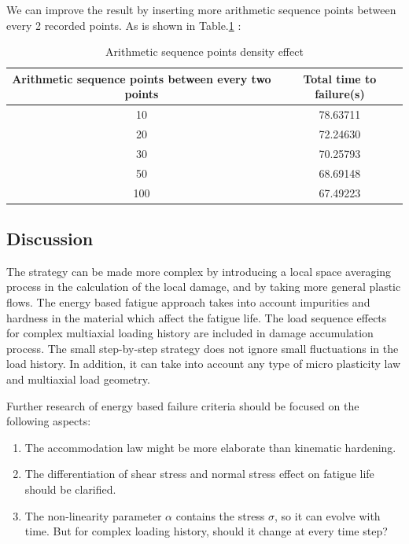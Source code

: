 \documentclass[3p,times,procedia,number]{elsarticle}
\begin{document}
We can improve the result by inserting more arithmetic sequence points between every 2 recorded points. As is shown in Table.\ref{steppoints} :

\begin{table}[!h]
	\centering
	\caption{Arithmetic sequence points density effect}
	\label{steppoints}
	\begin{tabular}{cc}
		\hline
		\textbf{Arithmetic sequence points between every two points} & \textbf{Total time to failure(s)} \\ \hline
		10                                                           & 78.63711                          \\ 
		20                                                           & 72.24630                          \\ 
		30                                                           & 70.25793                          \\ 
		50                                                           & 68.69148                          \\ 
		100                                                          & 67.49223                          \\ \hline
	\end{tabular}
\end{table}

\subsection{Discussion}

The strategy can be made more complex by introducing a local space averaging process in the calculation of the local damage, and by taking more general plastic flows. The energy based fatigue approach takes into account impurities and hardness in the material which affect the fatigue life. The load sequence effects for complex multiaxial loading history are included in damage accumulation process. The small step-by-step strategy does not ignore small fluctuations in the load history. In addition, it can take into account any type of micro plasticity law and multiaxial load geometry.

Further research of energy based failure criteria should be focused on the following aspects:
\begin{enumerate}
	\item The  accommodation law might be more elaborate than kinematic hardening.
	
	\vspace{6pt}
	\item The differentiation of shear stress and normal stress effect on fatigue life should be clarified.
	
	\vspace{6pt}
	\item The non-linearity parameter $\alpha$ contains the stress $\sigma$, so it can evolve with time. But for complex loading history, should it change at every time step?
	
\end{enumerate}
\end{document}
